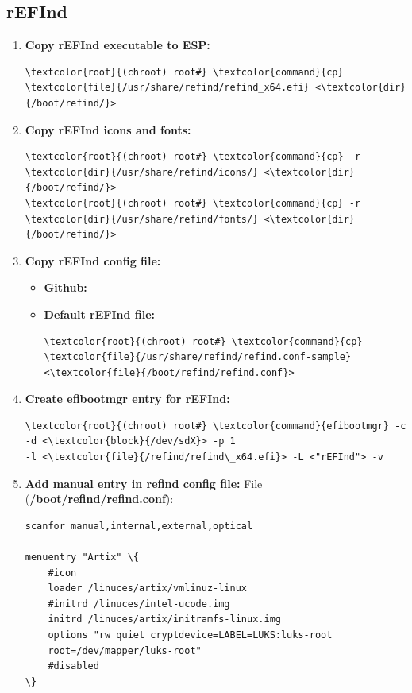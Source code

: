 \documentclass[10pt, a4paper, onecolumn, oneside, titlepage, openany]{book}
\begin{document}
\subsection{rEFInd}
\begin{enumerate}
    \item \textbf{Copy rEFInd executable to ESP:}
\begin{Verbatim}[commandchars=\\\{\}]
\textcolor{root}{(chroot) root#} \textcolor{command}{cp} \textcolor{file}{/usr/share/refind/refind_x64.efi} <\textcolor{dir}{/boot/refind/}>
\end{Verbatim}
    \item \textbf{Copy rEFInd icons and fonts:}
\begin{Verbatim}[commandchars=\\\{\}]
\textcolor{root}{(chroot) root#} \textcolor{command}{cp} -r \textcolor{dir}{/usr/share/refind/icons/} <\textcolor{dir}{/boot/refind/}>
\textcolor{root}{(chroot) root#} \textcolor{command}{cp} -r \textcolor{dir}{/usr/share/refind/fonts/} <\textcolor{dir}{/boot/refind/}>
\end{Verbatim}
    \item \textbf{Copy rEFInd config file:}
    \begin{itemize}
        \item \textbf{Github:}
\newline \url{}
        \item \textbf{Default rEFInd file:}
\begin{Verbatim}[commandchars=\\\{\}]
\textcolor{root}{(chroot) root#} \textcolor{command}{cp} \textcolor{file}{/usr/share/refind/refind.conf-sample}
<\textcolor{file}{/boot/refind/refind.conf}>
\end{Verbatim}
    \end{itemize}
    \item \textbf{Create efibootmgr entry for rEFInd:}
\begin{Verbatim}[commandchars=\\\{\}]
\textcolor{root}{(chroot) root#} \textcolor{command}{efibootmgr} -c -d <\textcolor{block}{/dev/sdX}> -p 1
-l <\textcolor{file}{/refind/refind\_x64.efi}> -L <"rEFInd"> -v
\end{Verbatim}
    \item \textbf{Add manual entry in refind config file:}
\newline File (\textbf{\textcolor{file}{/boot/refind/refind.conf}}):
\begin{Verbatim}[commandchars=\\\{\}]
scanfor manual,internal,external,optical

menuentry "Artix" \{
    #icon
    loader /linuces/artix/vmlinuz-linux
    #initrd /linuces/intel-ucode.img
    initrd /linuces/artix/initramfs-linux.img
    options "rw quiet cryptdevice=LABEL=LUKS:luks-root
    root=/dev/mapper/luks-root"
    #disabled
\}
\end{Verbatim}
\end{enumerate}
\end{document}
